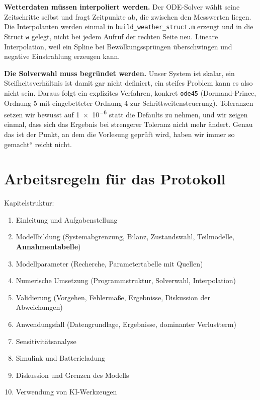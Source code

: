 \documentclass[11pt,a4paper]{scrartcl}
\providecommand{\glqq}{\quotedblbase}
\providecommand{\grqq}{\textquotedblleft}
\begin{document}
\textbf{Wetterdaten m\"ussen interpoliert werden.} Der ODE-Solver w\"ahlt
seine Zeitschritte selbst und fragt Zeitpunkte ab, die zwischen den
Messwerten liegen. Die Interpolanten werden einmal in
\texttt{build\_weather\_struct.m} erzeugt und in die Struct \texttt{w}
gelegt, nicht bei jedem Aufruf der rechten Seite neu. Lineare Interpolation,
weil ein Spline bei Bew\"olkungsspr\"ungen \"uberschwingen und negative
Einstrahlung erzeugen kann.

\textbf{Die Solverwahl muss begr\"undet werden.} Unser System ist skalar,
ein Steifheitsverh\"altnis ist damit gar nicht definiert, ein steifes
Problem kann es also nicht sein. Daraus folgt ein explizites Verfahren,
konkret \texttt{ode45} (Dormand-Prince, Ordnung 5 mit eingebetteter Ordnung 4
zur Schrittweitensteuerung). Toleranzen setzen wir bewusst auf
\num{1e-6} statt die Defaults zu nehmen, und wir zeigen einmal, dass sich
das Ergebnis bei strengerer Toleranz nicht mehr \"andert. Genau das ist der
Punkt, an dem die Vorlesung gepr\"uft wird, \glqq haben wir immer so gemacht\grqq{}
reicht nicht.

\section{Arbeitsregeln f\"ur das Protokoll}

Kapitelstruktur:

\begin{enumerate}[leftmargin=*]
  \item Einleitung und Aufgabenstellung
  \item Modellbildung (Systemabgrenzung, Bilanz, Zustandswahl, Teilmodelle,
        \textbf{Annahmentabelle})
  \item Modellparameter (Recherche, Parametertabelle mit Quellen)
  \item Numerische Umsetzung (Programmstruktur, Solverwahl, Interpolation)
  \item Validierung (Vorgehen, Fehlerma{\ss}e, Ergebnisse, Diskussion der Abweichungen)
  \item Anwendungsfall (Datengrundlage, Ergebnisse, dominanter Verlustterm)
  \item Sensitivit\"atsanalyse
  \item Simulink und Batterieladung
  \item Diskussion und Grenzen des Modells
  \item Verwendung von KI-Werkzeugen
\end{enumerate}
\end{document}
